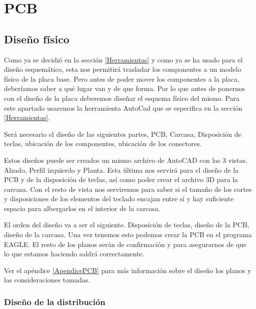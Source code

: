 \chapter{PCB}

\section{Diseño físico} \label{DiseñoFisico}

Como ya se decidió en la sección \ref{Herramientas} y como ya se ha usado para el diseño esquemático, esta nos permitirá trasladar los componentes a un modelo físico de la placa base. Pero antes de poder mover los componentes a la placa, deberíamos saber a qué lugar van y de que forma. Por lo que antes de ponernos con el diseño de la placa deberemos diseñar el esquema físico del mismo. Para este apartado usaremos la herramienta AutoCad que se especifica en la sección \ref{Herramientas}.

Será necesario el diseño de las siguientes partes, \gls{PCB}, Carcasa, Disposición de teclas, ubicación de los componentes, ubicación de los conectores.

Estos diseños puede ser creados un mismo archivo de AutoCAD con las 3 vistas. Alzado, Perfil izquierdo y Planta. Esta última nos servirá para el diseño de la \gls{PCB} y de la disposición de teclas, así como poder crear el archivo 3D para la carcasa. Con el resto de vista nos serviremos para saber si el tamaño de los cortes y disposiciones de los elementos del teclado encajan entre sí y hay suficiente espacio para albergarlos en el interior de la carcasa.

El orden del diseño va a ser el siguiente. Disposición de teclas, diseño de la \gls{PCB}, diseño de la carcasa. Una vez tenemos esto podemos crear la \gls{PCB} en el programa EAGLE. El resto de los planos serán de confirmación y para asegurarnos de que lo que estamos haciendo saldrá correctamente.

\begin{tcolorbox}[colback=blue!5!white, colframe=blue!55!white, title=Nota]
    Ver el apéndice \ref{ApendicePCB} para más información sobre el diseño los planos y las consideraciones tomadas. 
\end{tcolorbox}

\newpage
\subsection{Diseño de la distribución} \label{CreacionPlanoDistribucion}

